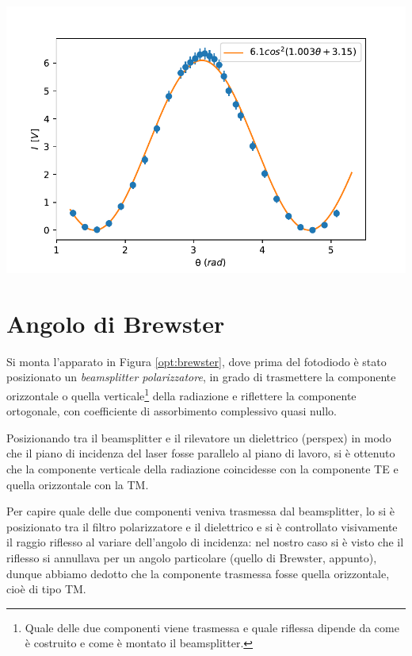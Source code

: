 \documentclass[10pt,oneside,a4paper]{article}
\newenvironment{Figure}
  {\par\medskip\noindent\minipage{\linewidth}}
  {\endminipage\par\medskip}
\begin{document}
\begin{multicols}{2}
\begin{Figure}
	\begin{center}
	\includegraphics[width=\linewidth]{malus1.pdf}
	\label{fig:malus}
	\end{center}
\end{Figure}

\section{Angolo di Brewster}
Si monta l'apparato in Figura \ref{opt:brewster}, dove prima del fotodiodo è stato posizionato un \emph{beamsplitter polarizzatore}, in grado di trasmettere la componente orizzontale o quella verticale\footnote{Quale delle due componenti viene trasmessa e quale riflessa dipende da come è costruito e come è montato il beamsplitter.} della radiazione e riflettere la componente ortogonale, con coefficiente di assorbimento complessivo quasi nullo. 

Posizionando tra il beamsplitter e il rilevatore un dielettrico (perspex) in modo che il piano di incidenza del laser fosse parallelo al piano di lavoro, si è ottenuto che la componente verticale della radiazione coincidesse con la componente TE e quella orizzontale con la TM.

Per capire quale delle due componenti veniva trasmessa dal beamsplitter, lo si è posizionato tra il filtro polarizzatore e il dielettrico e si è controllato visivamente il raggio riflesso al variare dell'angolo di incidenza: nel nostro caso si è visto che il riflesso si annullava per un angolo particolare (quello di Brewster, appunto), dunque abbiamo dedotto che la componente trasmessa fosse quella orizzontale, cioè di tipo TM.


\end{multicols}
\end{document}
